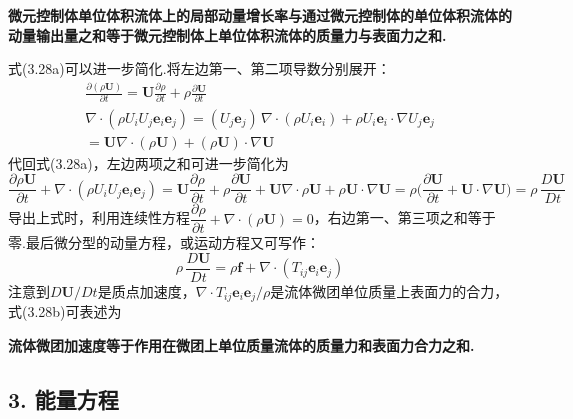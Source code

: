 \textbf{微元控制体单位体积流体上的局部动量增长率与通过微元控制体的单位体积流体的动量输出量之和等于微元控制体上单位体积流体的质量力与表面力之和.}

式(3.28a)可以进一步简化.将左边第一、第二项导数分别展开：
\begin{gather*}
\frac{\partial(\rho\boldsymbol{U})}{\partial t}=\boldsymbol{U}\frac{\partial\rho}{\partial t}+\rho\frac{\partial\boldsymbol{U}}{\partial t}\\[2pt]
\nabla\cdot(\rho U_iU_j\boldsymbol{e}_i\boldsymbol{e}_j)=(U_j\boldsymbol{e}_j)\,\nabla\cdot(\rho U_i\boldsymbol{e}_i)+\rho U_i\boldsymbol{e}_i\cdot\nabla U_j\boldsymbol{e}_j\\
=\boldsymbol{U}\nabla\cdot(\rho\boldsymbol{U})+(\rho\boldsymbol{U})\cdot\nabla\boldsymbol{U}
\end{gather*}
代回式(3.28a)，左边两项之和可进一步简化为
\[
\frac{\partial\rho\boldsymbol{U}}{\partial t}+\nabla\cdot(\rho U_iU_j\boldsymbol{e}_i\boldsymbol{e}_j)=\boldsymbol{U}\frac{\partial\rho}{\partial t}+\rho\frac{\partial\boldsymbol{U}}{\partial t}+\boldsymbol{U}\nabla\cdot\rho\boldsymbol{U}+\rho\boldsymbol{U}\cdot\nabla\boldsymbol{U}=\rho\Big(\frac{\partial\boldsymbol{U}}{\partial t}+\boldsymbol{U}\cdot\nabla\boldsymbol{U}\Big)=\rho\,\frac{D\boldsymbol{U}}{Dt}
\]
导出上式时，利用连续性方程$\dfrac{\partial\rho}{\partial t}+\nabla\cdot(\rho\boldsymbol{U})=0$，右边第一、第三项之和等于零.最后微分型的动量方程，或运动方程又可写作：
\begin{equation*}
\rho\,\frac{D\boldsymbol{U}}{Dt}=\rho\boldsymbol{f}+\nabla\cdot(T_{ij}\boldsymbol{e}_i\boldsymbol{e}_j)
\tag{3.28b}
\end{equation*}
注意到$D\boldsymbol{U}/Dt$是质点加速度，$\nabla\cdot T_{ij}\boldsymbol{e}_i\boldsymbol{e}_j/\rho$是流体微团单位质量上表面力的合力，式(3.28b)可表述为

\textbf{流体微团加速度等于作用在微团上单位质量流体的质量力和表面力合力之和.}

\subsection*{3. 能量方程}

